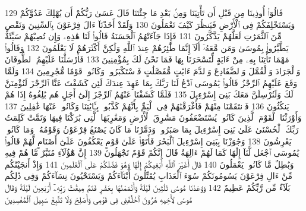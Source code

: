 {\tiny\colorbox{cl_aya}{129}} قَالُوٓا۟ أُوذِينَا مِن قَبْلِ أَن تَأْتِيَنَا وَمِنۢ بَعْدِ مَا جِئْتَنَا قَالَ عَسَىٰ رَبُّكُمْ أَن يُهْلِكَ عَدُوَّكُمْ وَيَسْتَخْلِفَكُمْ فِى ٱلْأَرْضِ فَيَنظُرَ كَيْفَ تَعْمَلُونَ
{\tiny\colorbox{cl_aya}{130}} وَلَقَدْ أَخَذْنَآ ءَالَ فِرْعَوْنَ بِٱلسِّنِينَ وَنَقْصٍ مِّنَ ٱلثَّمَرَٰتِ لَعَلَّهُمْ يَذَّكَّرُونَ
{\tiny\colorbox{cl_aya}{131}} فَإِذَا جَآءَتْهُمُ ٱلْحَسَنَةُ قَالُوا۟ لَنَا هَٰذِهِۦ وَإِن تُصِبْهُمْ سَيِّئَةٌ يَطَّيَّرُوا۟ بِمُوسَىٰ وَمَن مَّعَهُۥٓ أَلَآ إِنَّمَا طَٰٓئِرُهُمْ عِندَ ٱللَّهِ وَلَٰكِنَّ أَكْثَرَهُمْ لَا يَعْلَمُونَ
{\tiny\colorbox{cl_aya}{132}} وَقَالُوا۟ مَهْمَا تَأْتِنَا بِهِۦ مِنْ ءَايَةٍ لِّتَسْحَرَنَا بِهَا فَمَا نَحْنُ لَكَ بِمُؤْمِنِينَ
{\tiny\colorbox{cl_aya}{133}} فَأَرْسَلْنَا عَلَيْهِمُ ٱلطُّوفَانَ وَٱلْجَرَادَ وَٱلْقُمَّلَ وَٱلضَّفَادِعَ وَٱلدَّمَ ءَايَٰتٍ مُّفَصَّلَٰتٍ فَٱسْتَكْبَرُوا۟ وَكَانُوا۟ قَوْمًا مُّجْرِمِينَ
{\tiny\colorbox{cl_aya}{134}} وَلَمَّا وَقَعَ عَلَيْهِمُ ٱلرِّجْزُ قَالُوا۟ يَٰمُوسَى ٱدْعُ لَنَا رَبَّكَ بِمَا عَهِدَ عِندَكَ لَئِن كَشَفْتَ عَنَّا ٱلرِّجْزَ لَنُؤْمِنَنَّ لَكَ وَلَنُرْسِلَنَّ مَعَكَ بَنِىٓ إِسْرَٰٓءِيلَ
{\tiny\colorbox{cl_aya}{135}} فَلَمَّا كَشَفْنَا عَنْهُمُ ٱلرِّجْزَ إِلَىٰٓ أَجَلٍ هُم بَٰلِغُوهُ إِذَا هُمْ يَنكُثُونَ
{\tiny\colorbox{cl_aya}{136}} فَٱنتَقَمْنَا مِنْهُمْ فَأَغْرَقْنَٰهُمْ فِى ٱلْيَمِّ بِأَنَّهُمْ كَذَّبُوا۟ بِـَٔايَٰتِنَا وَكَانُوا۟ عَنْهَا غَٰفِلِينَ
{\tiny\colorbox{cl_aya}{137}} وَأَوْرَثْنَا ٱلْقَوْمَ ٱلَّذِينَ كَانُوا۟ يُسْتَضْعَفُونَ مَشَٰرِقَ ٱلْأَرْضِ وَمَغَٰرِبَهَا ٱلَّتِى بَٰرَكْنَا فِيهَا وَتَمَّتْ كَلِمَتُ رَبِّكَ ٱلْحُسْنَىٰ عَلَىٰ بَنِىٓ إِسْرَٰٓءِيلَ بِمَا صَبَرُوا۟ وَدَمَّرْنَا مَا كَانَ يَصْنَعُ فِرْعَوْنُ وَقَوْمُهُۥ وَمَا كَانُوا۟ يَعْرِشُونَ
{\tiny\colorbox{cl_aya}{138}} وَجَٰوَزْنَا بِبَنِىٓ إِسْرَٰٓءِيلَ ٱلْبَحْرَ فَأَتَوْا۟ عَلَىٰ قَوْمٍ يَعْكُفُونَ عَلَىٰٓ أَصْنَامٍ لَّهُمْ قَالُوا۟ يَٰمُوسَى ٱجْعَل لَّنَآ إِلَٰهًا كَمَا لَهُمْ ءَالِهَةٌ قَالَ إِنَّكُمْ قَوْمٌ تَجْهَلُونَ
{\tiny\colorbox{cl_aya}{139}} إِنَّ هَٰٓؤُلَآءِ مُتَبَّرٌ مَّا هُمْ فِيهِ وَبَٰطِلٌ مَّا كَانُوا۟ يَعْمَلُونَ
{\tiny\colorbox{cl_aya}{140}} قَالَ أَغَيْرَ ٱللَّهِ أَبْغِيكُمْ إِلَٰهًا وَهُوَ فَضَّلَكُمْ عَلَى ٱلْعَٰلَمِينَ
{\tiny\colorbox{cl_aya}{141}} وَإِذْ أَنجَيْنَٰكُم مِّنْ ءَالِ فِرْعَوْنَ يَسُومُونَكُمْ سُوٓءَ ٱلْعَذَابِ يُقَتِّلُونَ أَبْنَآءَكُمْ وَيَسْتَحْيُونَ نِسَآءَكُمْ وَفِى ذَٰلِكُم بَلَآءٌ مِّن رَّبِّكُمْ عَظِيمٌ
{\tiny\colorbox{cl_aya}{142}} وَوَٰعَدْنَا مُوسَىٰ ثَلَٰثِينَ لَيْلَةً وَأَتْمَمْنَٰهَا بِعَشْرٍ فَتَمَّ مِيقَٰتُ رَبِّهِۦٓ أَرْبَعِينَ لَيْلَةً وَقَالَ مُوسَىٰ لِأَخِيهِ هَٰرُونَ ٱخْلُفْنِى فِى قَوْمِى وَأَصْلِحْ وَلَا تَتَّبِعْ سَبِيلَ ٱلْمُفْسِدِينَ
